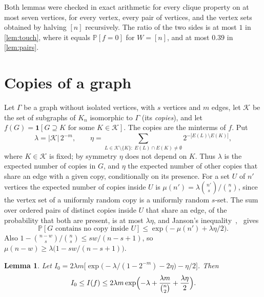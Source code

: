 \documentclass[11pt]{amsart}
\newtheorem{lemma}[theorem]{Lemma}
\theoremstyle{remark}
\renewcommand{\Pr}{\mathbb{P}}
\newcommand{\K}{\mathcal K}
\begin{document}
Both lemmas were checked in exact arithmetic for every clique property on at most seven vertices, for every vertex,
every pair of vertices, and the vertex sets obtained by halving $[n]$ recursively. The ratio of the two sides is at
most $1$ in \cref{lem:touch}, where it equals $\Pr[f=0]$ for $W=[n]$, and at most $0.39$ in \cref{lem:pairs}.

\section{Copies of a graph}\label{sec:copies}

Let $\Gamma$ be a graph without isolated vertices, with $s$ vertices and $m$ edges, let $\K$ be the set of subgraphs of
$K_n$ isomorphic to $\Gamma$ (its \emph{copies}), and let $f(G)=\mathbf 1[G\supseteq K\text{ for some }K\in\K]$. The
copies are the minterms of $f$. Put
\[
\lambda=|\K|\,2^{-m},\qquad \eta=\sum_{L\in\K\setminus\{K\}:\ E(L)\cap E(K)\neq\emptyset}2^{-|E(L)\setminus E(K)|},
\]
where $K\in\K$ is fixed; by symmetry $\eta$ does not depend on $K$. Thus $\lambda$ is the expected number of copies in
$G$, and $\eta$ the expected number of other copies that share an edge with a given copy, conditionally on its
presence. For a set $U$ of $n'$ vertices the expected number of copies inside $U$ is
$\mu(n')=\lambda\binom{n'}s/\binom ns$, since the vertex set of a uniformly random copy is a uniformly random $s$-set.
The sum over ordered pairs of distinct copies inside $U$ that share an edge, of the probability that both are present,
is at most $\lambda\eta$, and Janson's inequality~\cite{JLR90},~\cite[Theorem~8.1.1]{AS16} gives
\begin{equation}\label{eq:janson}
\Pr[G\text{ contains no copy inside }U]\le\exp\bigl(-\mu(n')+\lambda\eta/2\bigr).
\end{equation}
Also $1-\binom{n-w}s/\binom ns\le sw/(n-s+1)$, so $\mu(n-w)\ge\lambda\bigl(1-sw/(n-s+1)\bigr)$.

\begin{lemma}\label{lem:infl}
Let $I_0=2\lambda m\bigl[\exp\bigl(-\lambda/(1-2^{-m})-2\eta\bigr)-\eta/2\bigr]$. Then
\[
I_0\le I(f)\le2\lambda m\exp\Bigl(-\lambda+\frac{\lambda m}{\binom n2}+\frac{\lambda\eta}2\Bigr).
\]
\end{lemma}
\end{document}
